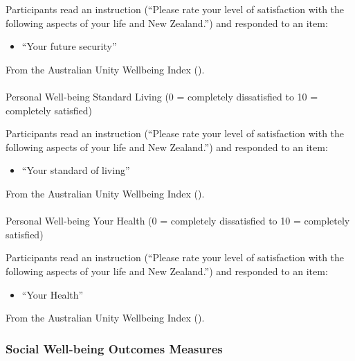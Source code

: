 \documentclass[
  single column]{article}
\makeatletter
\let\oldparagraph\paragraph
\renewcommand{\paragraph}{
    \@ifstar
      \xxxParagraphStar
      \xxxParagraphNoStar
  }
\newcommand{\xxxParagraphStar}[1]{\oldparagraph*{#1}\mbox{}}
\newcommand{\xxxParagraphNoStar}[1]{\oldparagraph{#1}\mbox{}}
\providecommand{\tightlist}{%
  \setlength{\itemsep}{0pt}\setlength{\parskip}{0pt}}\usepackage{longtable,booktabs,array}
\makeatother
\begin{document}
Participants read an instruction (``Please rate your level of
satisfaction with the following aspects of your life and New Zealand.'')
and responded to an item:

\begin{itemize}
\tightlist
\item
  ``Your future security''
\end{itemize}

From the Australian Unity Wellbeing Index
().

\paragraph{Personal Well-being Standard Living (0 = completely
dissatisfied to 10 = completely
satisfied)}\label{personal-well-being-standard-living-0-completely-dissatisfied-to-10-completely-satisfied}

Participants read an instruction (``Please rate your level of
satisfaction with the following aspects of your life and New Zealand.'')
and responded to an item:

\begin{itemize}
\tightlist
\item
  ``Your standard of living''
\end{itemize}

From the Australian Unity Wellbeing Index
().

\paragraph{Personal Well-being Your Health (0 = completely dissatisfied
to 10 = completely
satisfied)}\label{personal-well-being-your-health-0-completely-dissatisfied-to-10-completely-satisfied}

Participants read an instruction (``Please rate your level of
satisfaction with the following aspects of your life and New Zealand.'')
and responded to an item:

\begin{itemize}
\tightlist
\item
  ``Your Health''
\end{itemize}

From the Australian Unity Wellbeing Index
().

\subsubsection{Social Well-being Outcomes
Measures}\label{social-well-being-outcomes-measures}
\end{document}
